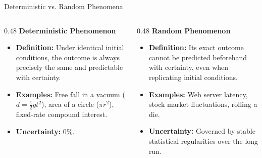 \documentclass[10pt,aspectratio=169]{beamer}
\begin{document}
\begin{frame}{Deterministic vs. Random Phenomena}
  \begin{columns}[T]
    \begin{column}{0.48\textwidth}
      {\large \color{TecAzulOscuro}\textbf{Deterministic Phenomenon}}
      \vspace{0.3em}
      \begin{itemize}
        \item \textbf{Definition:} Under identical initial conditions, the outcome is always precisely the same and predictable with certainty. \pause
        \item \textbf{Examples:} Free fall in a vacuum ($d = \frac{1}{2}gt^2$), area of a circle ($\pi r^2$), fixed-rate compound interest. \pause
        \item \textbf{Uncertainty:} $0\%$.
      \end{itemize}
    \end{column}
    
    \begin{column}{0.48\textwidth}
      {\large \color{TecRojo}\textbf{Random Phenomenon}}
      \vspace{0.3em}
      \begin{itemize}
        \item \textbf{Definition:} Its exact outcome cannot be predicted beforehand with certainty, even when replicating initial conditions. \pause
        \item \textbf{Examples:} Web server latency, stock market fluctuations, rolling a die. \pause
        \item \textbf{Uncertainty:} Governed by stable statistical regularities over the long run.
      \end{itemize}
    \end{column}
  \end{columns}
\end{frame}
\end{document}
